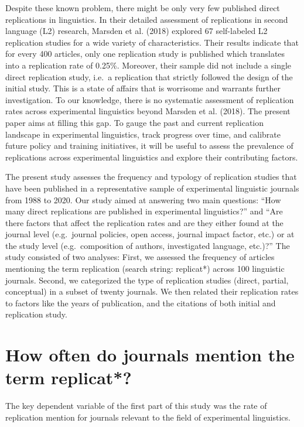 \documentclass[]{elsarticle} %
\begin{document}
Despite these known problem, there might be only very few published direct replications in linguistics. In their detailed assessment of replications in second language (L2) research, Marsden et al. (2018) explored 67 self-labeled L2 replication studies for a wide variety of characteristics. Their results indicate that for every 400 articles, only one replication study is published which translates into a replication rate of 0.25\%. Moreover, their sample did not include a single direct replication study, i.e.~a replication that strictly followed the design of the initial study. This is a state of affairs that is worrisome and warrants further investigation. To our knowledge, there is no systematic assessment of replication rates across experimental linguistics beyond Marsden et al. (2018). The present paper aims at filling this gap. To gauge the past and current replication landscape in experimental linguistics, track progress over time, and calibrate future policy and training initiatives, it will be useful to assess the prevalence of replications across experimental linguistics and explore their contributing factors.

The present study assesses the frequency and typology of replication studies that have been published in a representative sample of experimental linguistic journals from 1988 to 2020.
Our study aimed at answering two main questions: ``How many direct replications are published in experimental linguistics?'' and ``Are there factors that affect the replication rates and are they either found at the journal level (e.g.~journal policies, open access, journal impact factor, etc.) or at the study level (e.g.~composition of authors, investigated language, etc.)?''
The study consisted of two analyses:
First, we assessed the frequency of articles mentioning the term replication (search string: replicat*) across 100 linguistic journals.
Second, we categorized the type of replication studies (direct, partial, conceptual) in a subset of twenty journals. We then related their replication rates to factors like the years of publication, and the citations of both initial and replication study.

\hypertarget{how-often-do-journals-mention-the-term-replicat}{%
\section{How often do journals mention the term replicat*?}\label{how-often-do-journals-mention-the-term-replicat}}

The key dependent variable of the first part of this study was the rate of replication mention for journals relevant to the field of experimental linguistics.
\end{document}
